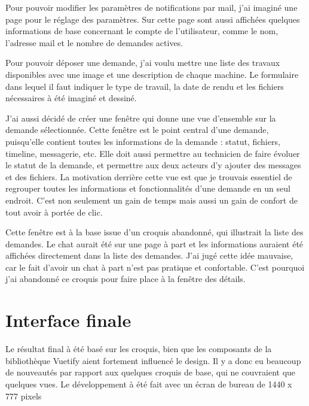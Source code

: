 \documentclass[
    iai, %
    eai, %
]{heig-tb}
\begin{document}
Pour pouvoir modifier les paramètres de notifications par mail, j'ai imaginé une page pour le réglage des paramètres.
Sur cette page sont aussi affichées quelques informations de base concernant le compte de l'utilisateur, comme le nom, l'adresse mail et le nombre de demandes actives.

Pour pouvoir déposer une demande, j'ai voulu mettre une liste des travaux disponibles avec une image et une description de chaque machine.
Le formulaire dans lequel il faut indiquer le type de travail, la date de rendu et les fichiers nécessaires à été imaginé et dessiné.

\newpage
{}

J'ai aussi décidé de créer une fenêtre qui donne une vue d'ensemble sur la demande sélectionnée.
Cette fenêtre est le point central d'une demande, puisqu'elle contient toutes les informations de la demande : statut, fichiers, timeline, messagerie, etc.
Elle doit aussi permettre au technicien de faire évoluer le statut de la demande, et permettre aux deux acteurs d'y ajouter des messages et des fichiers.
La motivation derrière cette vue est que je trouvais essentiel de regrouper toutes les informations et fonctionnalités d'une demande en un seul endroit. C'est non seulement un gain de temps mais aussi un gain de confort de tout avoir à portée de clic.

\newpage
{}

Cette fenêtre est à la base issue d'un croquis abandonné, qui illustrait la liste des demandes. Le chat aurait été sur une page à part et les informations auraient été affichées directement dans la liste des demandes. J'ai jugé cette idée mauvaise, car le fait d'avoir un chat à part n'est pas pratique et confortable. C'est pourquoi j'ai abandonné ce croquis pour faire place à la fenêtre des détails.


\newpage
\section{Interface finale}
Le résultat final à été basé sur les croquis, bien que les composants de la bibliothèque Vuetify aient fortement influencé le design.
Il y a donc eu beaucoup de nouveautés par rapport aux quelques croquis de base, qui ne couvraient que quelques vues.
Le développement à été fait avec un écran de bureau de 1440 x 777 pixels
\end{document}
